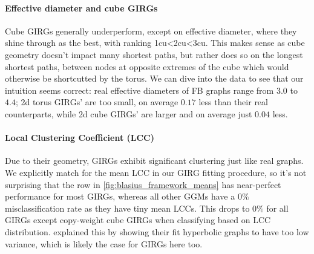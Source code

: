 \paragraph{Effective diameter and cube GIRGs}
Cube GIRGs generally underperform, except on effective diameter, where they shine through as the best, with ranking 1cu\textless 2cu\textless 3cu. This makes sense as cube geometry doesn't impact many shortest paths, but rather does so on the longest shortest paths, between nodes at opposite extremes of the cube which would otherwise be shortcutted by the torus. We can dive into the data to see that our intuition seems correct: real effective diameters of FB graphs range from $3.0$ to $4.4$; 2d torus GIRGs' are too small, on average $0.17$ less than their real counterparts, while 2d cube GIRGs' are larger and on average just $0.04$ less.








\paragraph{Local Clustering Coefficient (LCC)} Due to their geometry, GIRGs exhibit significant clustering just like real graphs. We explicitly match for the mean LCC in our GIRG fitting procedure, so it's not surprising that the  row in \cref{fig:blasius_framework_means} has near-perfect performance for most GIRGs, whereas all other GGMs have a $0\%$ misclassification rate as they have tiny mean LCCs. This drops to $0\%$ for all GIRGs except copy-weight cube GIRGs when classifying based on LCC distribution. \cite{blasius2018towards} explained this by showing their fit hyperbolic graphs to have too low variance, which is likely the case for GIRGs here too.

